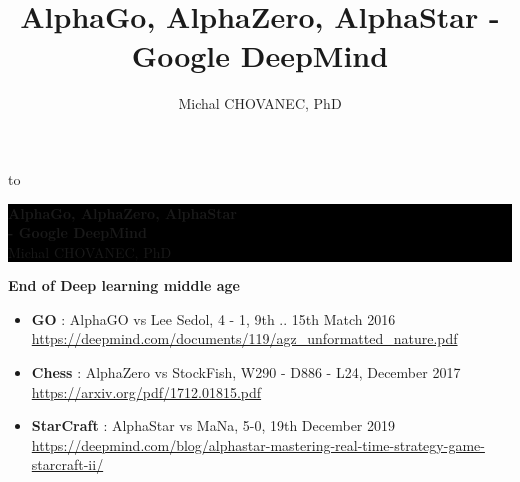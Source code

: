 \documentclass[xcolor=dvipsnames]{beamer}
\title{\color{white} \bf AlphaGo, AlphaZero, AlphaStar - Google DeepMind}
\author{\color{white} Michal CHOVANEC, PhD}
\date[EURP]{}
\begin{document}
{
    \usebackgroundtemplate
    {
        \vbox to 
    }
    \begin{frame}



    \centering
     \colorbox{black}
     {
        \begin{minipage}{12cm}
           {\LARGE \color{white} \bf AlphaGo, AlphaZero, AlphaStar \\- Google DeepMind} \\
           {\LARGE \color{white} Michal CHOVANEC, PhD} \\
       \end{minipage}
     }


    \end{frame}
}



\begin{frame}{\bf End of Deep learning middle age}

\begin{itemize}
  \item {\color{red} \bf GO} : AlphaGO vs Lee Sedol, 4 - 1, 9th .. 15th Match 2016
            {\tiny \url{https://deepmind.com/documents/119/agz\_unformatted\_nature.pdf}}
  \item {\color{red} \bf Chess} : AlphaZero vs StockFish,  W290 - D886 - L24, December 2017
            {\tiny \url{https://arxiv.org/pdf/1712.01815.pdf}}
  \item {\color{red} \bf StarCraft} : AlphaStar vs MaNa, 5-0, 19th December 2019
            {\tiny \url{https://deepmind.com/blog/alphastar-mastering-real-time-strategy-game-starcraft-ii/}}
\end{itemize}

\end{frame}
\end{document}
